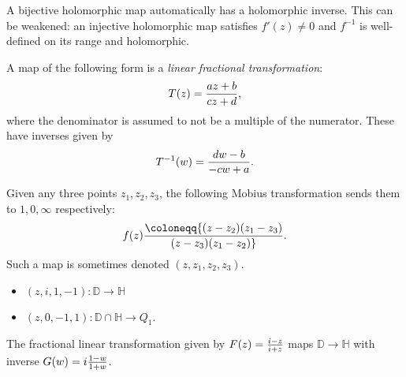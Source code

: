\begin{remark}

A bijective holomorphic map automatically has a holomorphic inverse.
This can be weakened: an injective holomorphic map satisfies
\(f'(z) \neq 0\) and \(f ^{-1}\) is well-defined on its range and
holomorphic.

\end{remark}

\begin{definition}

A map of the following form is a \emph{linear fractional
transformation}:
\begin{align*}  
T(z) = {az + b \over cz + d}
,\end{align*}
where the denominator is assumed to not be a multiple of the numerator.
These have inverses given by
\begin{align*}  
T^{-1}(w) = {dw-b \over -cw + a}
.\end{align*}

\end{definition}

\begin{proposition}[?]

Given any three points \(z_1, z_2, z_3\), the following Mobius
transformation sends them to \(1, 0, \infty\) respectively:
\begin{align*}
f(z) \coloneqq{ (z-z_2) (z_1-z_3) \over (z-z_3) (z_1 - z_2)}
.\end{align*}
Such a map is sometimes denoted \((z, z_1, z_2, z_3)\).

\end{proposition}

\begin{example}[?]

\envlist

\begin{itemize}
\tightlist
\item
  \((z, i, 1, -1): {\mathbb{D}}\to {\mathbb{H}}\)
\item
  \((z, 0, -1, 1): {\mathbb{D}}\cap{\mathbb{H}}\to Q_1\).
\end{itemize}

\end{example}

\begin{theorem}

The fractional linear transformation given by
\(F(z) = {i - z \over i + z}\) maps \({\mathbb{D}}\to {\mathbb{H}}\)
with inverse \(G(w) = i {1-w \over 1 + w}\).

\end{theorem}

